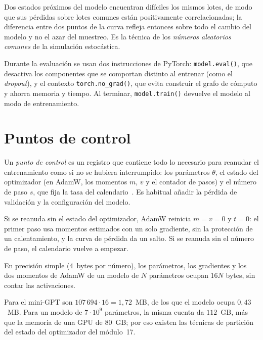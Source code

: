 Dos estados próximos del modelo encuentran difíciles los mismos lotes, de modo que sus pérdidas sobre lotes comunes están positivamente correlacionadas; la diferencia entre dos puntos de la curva refleja entonces sobre todo el cambio del modelo y no el azar del muestreo. Es la técnica de los \emph{números aleatorios comunes} de la simulación estocástica.

Durante la evaluación se usan dos instrucciones de PyTorch: \texttt{model.eval()}, que desactiva los componentes que se comportan distinto al entrenar (como el \emph{dropout}), y el contexto \texttt{torch.no\_grad()}, que evita construir el grafo de cómputo y ahorra memoria y tiempo. Al terminar, \texttt{model.train()} devuelve el modelo al modo de entrenamiento.

\section{Puntos de control}

\begin{definicion}\label{def:checkpoint}
Un \emph{punto de control} es un registro que contiene todo lo necesario para reanudar el entrenamiento como si no se hubiera interrumpido: los parámetros $\theta$, el estado del optimizador (en AdamW, los momentos $m$, $v$ y el contador de pasos) y el número de paso $s$, que fija la tasa del calendario~\cite[§5.2]{cs336}. Es habitual añadir la pérdida de validación y la configuración del modelo.
\end{definicion}

Si se reanuda sin el estado del optimizador, AdamW reinicia $m=v=0$ y $t=0$: el primer paso usa momentos estimados con un solo gradiente, sin la protección de un calentamiento, y la curva de pérdida da un salto. Si se reanuda sin el número de paso, el calendario vuelve a empezar.

\begin{proposicion}\label{prop:memoria}
En precisión simple (4~bytes por número), los parámetros, los gradientes y los dos momentos de AdamW de un modelo de $N$ parámetros ocupan $16N$ bytes, sin contar las activaciones.
\end{proposicion}

Para el mini-GPT son $107\,694\cdot 16=1{,}72$~MB, de los que el modelo ocupa $0{,}43$~MB. Para un modelo de $7\cdot 10^{9}$ parámetros, la misma cuenta da $112$~GB, más que la memoria de una GPU de $80$~GB; por eso existen las técnicas de partición del estado del optimizador del módulo~17.

